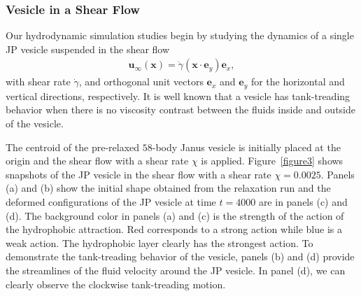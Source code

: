\documentclass[lineno]{jfm}
\newcommand{\xx}{\mathbf{x}}
\newcommand{\uu}{\mathbf{u}}
\begin{document}
\subsubsection{Vesicle in a Shear Flow}
\label{sec:ves_in_shear}
Our hydrodynamic simulation studies begin by studying the dynamics of a single JP vesicle suspended in
the shear flow
\begin{align}
  \uu_{\infty}(\xx) = \dot\gamma (\xx \cdot \mathbf{e}_y) \mathbf{e}_x,
\end{align}
with shear rate $\dot\gamma$, and orthogonal unit vectors $\mathbf{e}_x$
and $\mathbf{e}_y$ for the horizontal and vertical directions,
respectively. It is well known that a vesicle has tank-treading behavior
when there is no viscosity contrast between the fluids inside and
outside of the vesicle.

The centroid of the pre-relaxed $58$-body Janus vesicle is initially
placed at the origin and the shear flow with a shear rate $\chi$ is
applied. Figure~\ref{figure3} shows snapshots of the JP vesicle in the
shear flow with a shear rate $\chi=0.0025$. Panels (a) and (b) show the
initial shape obtained from the relaxation run and the deformed
configurations of the JP vesicle at time $t=4000$ are in panels (c) and
(d). The background color in panels (a) and (c) is the strength of the
action of the hydrophobic attraction. Red corresponds to a strong action
while blue is a weak action. The hydrophobic layer clearly has the
strongest action. To demonstrate the tank-treading behavior of the
vesicle, panels (b) and (d) provide the streamlines of the fluid
velocity around the JP vesicle. In panel (d), we can clearly observe the
clockwise tank-treading motion.



%
\end{document}

